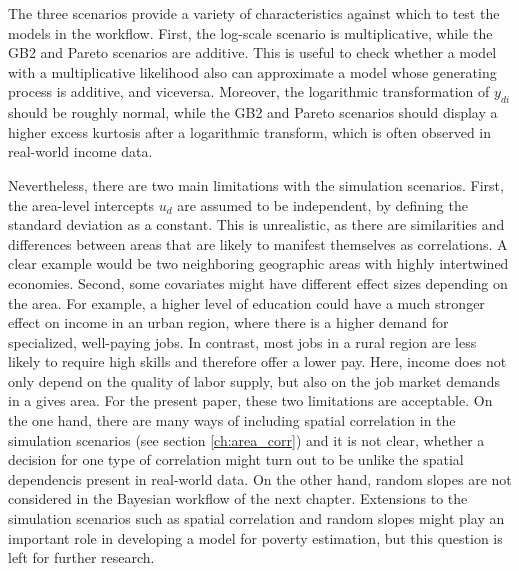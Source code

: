 The three scenarios provide a variety of characteristics against which to test the models in the workflow.
First, the log-scale scenario is multiplicative, while the GB2 and Pareto scenarios are additive.
This is useful to check whether a model with a multiplicative likelihood also can approximate a model whose generating process is additive, and viceversa.
Moreover, the logarithmic transformation of $y_{di}$ should be roughly normal, while the GB2 and Pareto scenarios should display a higher excess kurtosis after a logarithmic transform, which is often observed in real-world income data.

Nevertheless, there are two main limitations with the simulation scenarios.
First, the area-level intercepts $u_d$ are assumed to be independent, by defining the standard deviation as a constant.
This is unrealistic, as there are similarities and differences between areas that are likely to manifest themselves as correlations.
A clear example would be two neighboring geographic areas with highly intertwined economies.
Second, some covariates might have different effect sizes depending on the area.
For example, a higher level of education could have a much stronger effect on income in an urban region, where there is a higher demand for specialized, well-paying jobs.
In contrast, most jobs in a rural region are less likely to require high skills and therefore offer a lower pay.
Here, income does not only depend on the quality of labor supply, but also on the job market demands in a gives area.
For the present paper, these two limitations are acceptable.
On the one hand, there are many ways of including spatial correlation in the simulation scenarios (see section \ref{ch:area_corr}) and it is not clear, whether a decision for one type of correlation might turn out to be unlike the spatial dependencis present in real-world data.
On the other hand, random slopes are not considered in the Bayesian workflow of the next chapter.
Extensions to the simulation scenarios such as spatial correlation and random slopes might play an important role in developing a model for poverty estimation, but this question is left for further research.